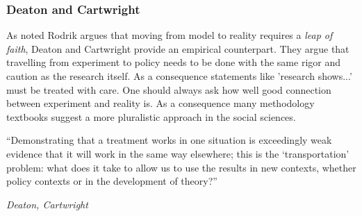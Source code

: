\documentclass[12pt, a4paper]{article}
\begin{document}
\begin{multicols}{2}
\subsubsection{Deaton and Cartwright}
As noted Rodrik argues that moving from model to reality requires a \textit{leap of faith}, Deaton and Cartwright provide an empirical counterpart. They argue that travelling from experiment to policy needs to be done with the same rigor and caution as the research itself. As a consequence statements like 'research shows...' must be treated with care. One should always ask how well good connection between experiment and reality is. As a consequence many methodology textbooks suggest a more pluralistic approach in the social sciences.
\epigraph{“Demonstrating that a treatment works in one situation is exceedingly weak evidence that it will work in the same way elsewhere; this is the ‘transportation’ problem: what does it take to allow us to use the results in new contexts, whether policy contexts or in the development of theory?”}{\textit{Deaton, Cartwright}}


\end{multicols}
\end{document}
